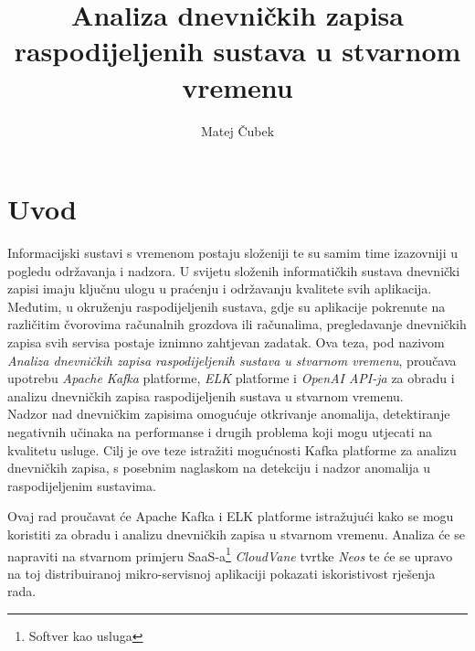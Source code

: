 \documentclass[times, utf8, diplomski]{fer}
\begin{document}

\title{Analiza dnevničkih zapisa raspodijeljenih sustava u stvarnom vremenu}

\author{Matej Čubek}

\maketitle

\zahvala{}

\renewcommand{\lstlistingname}{Isječak koda}%
\renewcommand{\lstlistlistingname}{Indeks isječka kodova}%


\tableofcontents


\begingroup
\renewcommand*\listfigurename{Indeks slika}
\renewcommand*\listtablename{Indeks tablica}

\listoffigures

\listoftables

\endgroup

\chapter{Uvod}

Informacijski sustavi s vremenom postaju složeniji te su samim time izazovniji u pogledu održavanja i nadzora. U svijetu složenih informatičkih sustava dnevnički zapisi imaju ključnu ulogu u praćenju i održavanju kvalitete svih aplikacija. Međutim, u okruženju raspodijeljenih sustava, gdje su aplikacije pokrenute na različitim čvorovima računalnih grozdova ili računalima, pregledavanje dnevničkih zapisa svih servisa postaje iznimno zahtjevan zadatak. Ova teza, pod nazivom \emph{\glqq Analiza dnevničkih zapisa raspodijeljenih sustava u stvarnom vremenu\grqq}, proučava upotrebu \emph{Apache Kafka} platforme, \emph{ELK} platforme i \emph{OpenAI API-ja} za obradu i analizu dnevničkih zapisa raspodijeljenih sustava u stvarnom vremenu.\\

Nadzor nad dnevničkim zapisima omogućuje otkrivanje anomalija, detektiranje negativnih učinaka na performanse i drugih problema koji mogu utjecati na kvalitetu usluge. Cilj je ove teze istražiti mogućnosti Kafka platforme za analizu dnevničkih zapisa, s posebnim naglaskom na detekciju i nadzor anomalija u raspodijeljenim sustavima.

Ovaj rad proučavat će Apache Kafka  i ELK platforme istražujući kako se mogu koristiti za obradu i analizu dnevničkih zapisa u stvarnom vremenu. Analiza će se napraviti na stvarnom primjeru SaaS-a\footnote{Softver kao usluga } \emph{CloudVane} tvrtke \emph{Neos} te će se upravo na toj distribuiranoj mikro-servisnoj aplikaciji pokazati iskoristivost rješenja rada.
\end{document}
